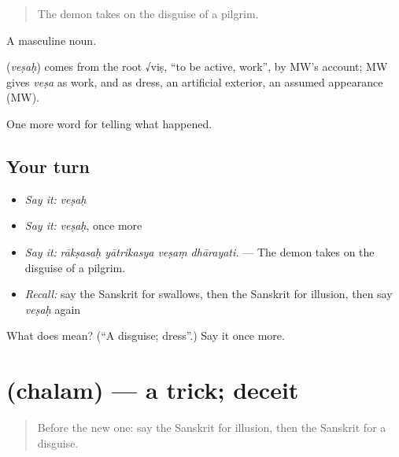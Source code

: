 \begin{quote}
The demon takes on the disguise of a pilgrim.
\end{quote}

A masculine noun.

\begin{cousinweb}
\textbf{} (\emph{veṣaḥ}) comes from the root √viṣ, \textquotedblleft{}to be active, work\textquotedblright{}, by MW's account; MW gives \emph{veṣa} as work, and as dress, an artificial exterior, an assumed appearance (MW).
\end{cousinweb}

\begin{grammarlens}[title={What you've built}]
One more word for telling what happened.
\end{grammarlens}

\subsection*{Your turn}
\begin{itemize}
\raggedright
  \item \emph{Say it:} \emph{veṣaḥ}
  \item \emph{Say it:} \emph{veṣaḥ}, once more
  \item \emph{Say it:} \emph{rākṣasaḥ yātrikasya veṣaṃ dhārayati.} — The demon takes on the disguise of a pilgrim.
  \item \emph{Recall:} say the Sanskrit for swallows, then the Sanskrit for illusion, then say \emph{veṣaḥ} again
\end{itemize}

\begin{tcolorbox}[breakable,colback=teal!4,colframe=teal!35!black,title={Before you move on}]
What does  mean? (\textquotedblleft{}A disguise; dress\textquotedblright{}.) Say it once more.
\end{tcolorbox}
\section[\texorpdfstring{\sk{छलम्} (chalam)}{छलम् (chalam)}]{ (chalam) — a trick; deceit}

\label{lesson:SA-C335-chalam}



\begin{quote}
Before the new one: say the Sanskrit for illusion, then the Sanskrit for a disguise.
\end{quote}


